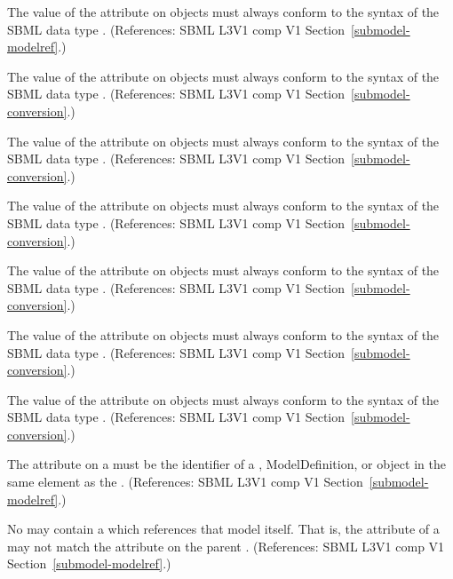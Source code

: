 \begin{sbmlenum}
 { The value of the  attribute 
  on \Submodel objects must always conform to the syntax of
  the SBML data type .
  (References: SBML L3V1 comp V1 Section~\ref{submodel-modelref}.) }


 { The value of the  attribute 
  on \Submodel objects must always conform to the syntax of
  the SBML data type .
  (References: SBML L3V1 comp V1 Section~\ref{submodel-conversion}.) }


 { The value of the  attribute 
  on \Submodel objects must always conform to the syntax of
  the SBML data type .
  (References: SBML L3V1 comp V1 Section~\ref{submodel-conversion}.) }


 { The value of the  attribute 
  on \Submodel objects must always conform to the syntax of
  the SBML data type .
  (References: SBML L3V1 comp V1 Section~\ref{submodel-conversion}.) }


 { The value of the  attribute 
  on \Submodel objects must always conform to the syntax of
  the SBML data type .
  (References: SBML L3V1 comp V1 Section~\ref{submodel-conversion}.) }


 { The value of the  attribute 
  on \Submodel objects must always conform to the syntax of
  the SBML data type .
  (References: SBML L3V1 comp V1 Section~\ref{submodel-conversion}.) }


 { The value of the  attribute 
  on \Submodel objects must always conform to the syntax of
  the SBML data type .
  (References: SBML L3V1 comp V1 Section~\ref{submodel-conversion}.) }


 { The  attribute on a \Submodel must
  be the identifier of a \Model, ModelDefinition, or
  \ExternalModelDefinition object in the same  element as the
  \Submodel. 
  (References: SBML L3V1 comp V1 Section~\ref{submodel-modelref}.) }

 { No \Model may contain a \Submodel which references
  that model itself.  That is, the  attribute of a
  \Submodel 
  may not match the
   attribute on the parent \Model. 
  (References: SBML L3V1 comp V1 Section~\ref{submodel-modelref}.) }


\end{sbmlenum}
